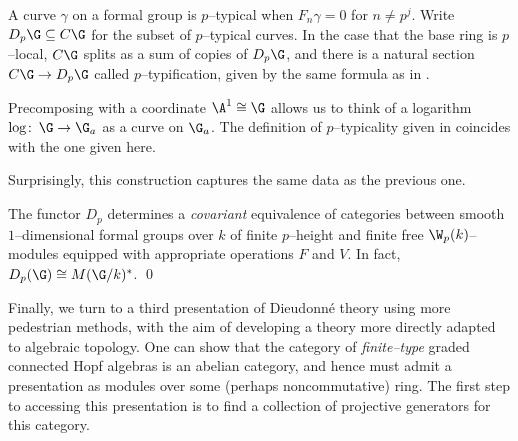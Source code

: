 \begin{definition}
A curve $\gamma$ on a formal group is $p$--typical when $F_n \gamma = 0$ for $n \ne p^j$.  Write $D_p\G \subseteq C\G$ for the subset of $p$--typical curves.  In the case that the base ring is $p$--local, $C\G$ splits as a sum of copies of $D_p \G$, and there is a natural section $C\G \to D_p \G$ called $p$--typification, given by the same formula as in .
\end{definition}

\begin{remark}
Precomposing with a coordinate $\A^1 \cong \G$ allows us to think of a logarithm $\log\co \G \to \G_a$ as a curve on $\G_a$.  The definition of $p$--typicality given in  coincides with the one given here.
\end{remark}

Surprisingly, this construction captures the same data as the previous one.

\begin{theorem}
The functor $D_p$ determines a \emph{covariant} equivalence of categories between smooth $1$--dimensional formal groups over $k$ of finite $p$--height and finite free $\W_p(k)$--modules equipped with appropriate operations $F$ and $V$.  In fact, $D_p(\G) \cong M(\G/k)^*$. \qed {}
\end{theorem}
Finally, we turn to a third presentation of Dieudonn\'e theory using more pedestrian methods, with the aim of developing a theory more directly adapted to algebraic topology.  One can show that the category of \emph{finite--type} graded  connected Hopf algebras is an abelian category, and hence must admit a presentation as modules over some (perhaps noncommutative) ring.  The first step to accessing this presentation is to find a collection of projective generators for this category.

